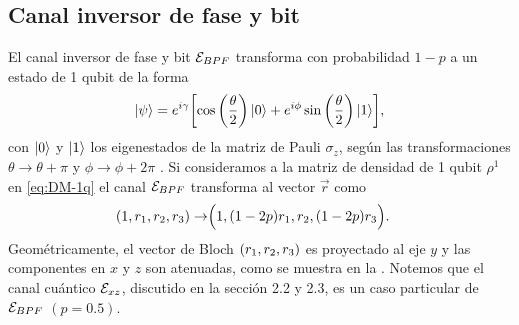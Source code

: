 \subsection{Canal inversor de fase y bit}
El canal inversor de fase y bit $\mathcal{E}_{BPF}$ transforma 
con probabilidad $1-p$ a un estado de 1 qubit de la forma  
\begin{align}
   \ket{\psi}=e^{i\gamma}\qty[\cos\qty(\frac{\theta}{2})\ket{0}
  +e^{i\phi}\sin \qty(\frac{\theta}{2})\ket{1}],
   \label{eq:psi-1qubit}
 \end{align} 
con $\ket{0}$ y $\ket{1}$ los eigenestados de 
la matriz de Pauli $\sigma_z$, según las transformaciones 
$\theta\to\theta+\pi$ y $\phi\to\phi+2\pi$ 
\cite{nielsen_chuang_2011}. 
Si consideramos a la matriz de densidad de 1 qubit
$\rho^1$ en \eqref{eq:DM-1q} el canal $\mathcal{E}_{BPF}$ 
transforma  al vector $\vec{r}$ como \cite{nielsen_chuang_2011}
\begin{align}
\qty(1,r_1,r_2,r_3)\rightarrow&\Big(1,\qty(1-2p)r_1,r_2,\qty(1-2p)r_3\Big).
\label{eq:bit-phase-flip-Bloch-trans}
\end{align}
Geométricamente, el vector de Bloch $\qty(r_1,r_2,r_3)$ es 
proyectado al eje $y$ y las componentes 
en $x$ y $z$ son atenuadas, como se muestra en la 
.
Notemos que el canal cuántico $\mathcal{E}_{xz}$, discutido 
en la sección 2.2 y 2.3, es un caso particular de $\mathcal{E}_{BPF}$ $(p=0.5)$.

